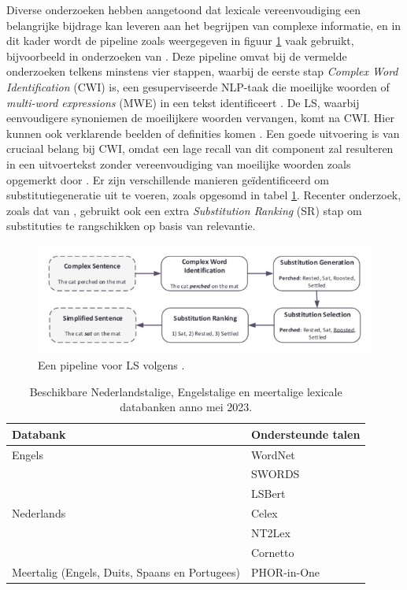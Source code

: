 \medspace

Diverse onderzoeken hebben aangetoond dat lexicale vereenvoudiging een belangrijke bijdrage kan leveren aan het begrijpen van complexe informatie, en in dit kader wordt de pipeline zoals weergegeven in figuur \ref{img:pipeline-lexical-simplification} vaak gebruikt, bijvoorbeeld in onderzoeken van \textcite{Paetzold2016, Bingel2018, Bulte2018}. Deze pipeline omvat bij de vermelde onderzoeken telkens minstens vier stappen, waarbij de eerste stap \textit{Complex Word Identification} (CWI) is, een gesuperviseerde NLP-taak die moeilijke woorden of \textit{multi-word expressions} (MWE) in een tekst identificeert \autocite{Shardlow2013, Gooding2019}. De LS, waarbij eenvoudigere synoniemen de moeilijkere woorden vervangen, komt na CWI. Hier kunnen ook verklarende beelden of definities komen \autocite{Zeng2005, Kandula2010}. Een goede uitvoering is van cruciaal belang bij CWI, omdat een lage recall van dit component zal resulteren in een uitvoertekst zonder vereenvoudiging van moeilijke woorden zoals opgemerkt door \textcite{Shardlow2013}. Er zijn verschillende manieren geïdentificeerd om substitutiegeneratie uit te voeren, zoals opgesomd in tabel \ref{table:lexical-databases}. Recenter onderzoek, zoals dat van \textcite{Zhou2019}, gebruikt ook een extra \textit{Substitution Ranking} (SR) stap om substituties te rangschikken op basis van relevantie. 

\begin{figure}[H]
	\includegraphics[width=15cm]{img/lexical-simplification-pipeline.png}
	\caption{Een pipeline voor LS volgens \textcite{Althunayyan2021}.}
	\label{img:pipeline-lexical-simplification}
\end{figure}

\begin{center}
\begin{table}[H]
	\begin{tabular}{ | m{7cm} | m{7cm} | } 
		\hline
		\textbf{Databank} & \textbf{Ondersteunde talen} \\
		\hline
		Engels & WordNet \\
		& SWORDS \\
		& LSBert \\
		\hline
		Nederlands & Celex \\
		& NT2Lex \\
		& Cornetto \\
		\hline
		Meertalig (Engels, Duits, Spaans en Portugees) & PHOR-in-One \\
		\hline	
	\end{tabular}
	\caption{Beschikbare Nederlandstalige, Engelstalige en meertalige lexicale databanken anno mei 2023.}
	\label{table:lexical-databases}
\end{table}
\end{center}

